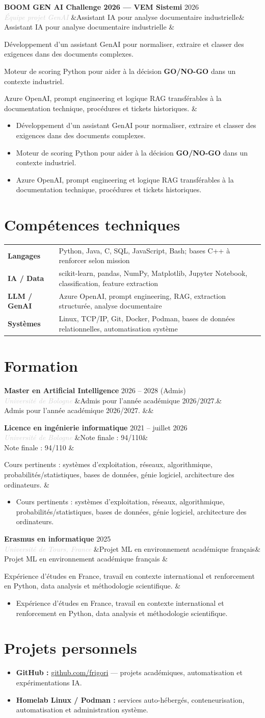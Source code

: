 \documentclass[a4paper,10pt]{article}
\newcommand{\entrylist}[5]{%
  \noindent\textbf{#1} \hfill \textcolor{accent}{#2}\\
  \textit{\textcolor{lightgray}{#3}}%
  \ifx&#4&\else\\[-0.05em]#4\fi
  \vspace{0.15em}
  \ifx&#5&\else\begin{itemize}#5\end{itemize}\fi
  \vspace{0.1em}
}
\newcommand{\skillrow}[2]{\textbf{#1} & #2 \\[0.15em]}
\begin{document}
\entrylist{BOOM GEN AI Challenge 2026 — VEM Sistemi}{2026}{Équipe projet GenAI}{Assistant IA pour analyse documentaire industrielle}{
  \item Développement d'un assistant GenAI pour normaliser, extraire et classer des exigences dans des documents complexes.
  \item Moteur de scoring Python pour aider à la décision \textbf{GO/NO-GO} dans un contexte industriel.
  \item Azure OpenAI, prompt engineering et logique RAG transférables à la documentation technique, procédures et tickets historiques.
}

\section{Compétences techniques}
\begin{tabularx}{\textwidth}{@{}>{\raggedright\arraybackslash}p{3.1cm}X@{}}
\skillrow{Langages}{Python, Java, C, SQL, JavaScript, Bash; bases C++ à renforcer selon mission}
\skillrow{IA / Data}{scikit-learn, pandas, NumPy, Matplotlib, Jupyter Notebook, classification, feature extraction}
\skillrow{LLM / GenAI}{Azure OpenAI, prompt engineering, RAG, extraction structurée, analyse documentaire}
\skillrow{Systèmes}{Linux, TCP/IP, Git, Docker, Podman, bases de données relationnelles, automatisation système}
\end{tabularx}

\section{Formation}
\entrylist{Master en Artificial Intelligence}{2026 -- 2028 (Admis)}{Université de Bologne}{Admis pour l'année académique 2026/2027.}{}

\entrylist{Licence en ingénierie informatique}{2021 -- juillet 2026}{Université de Bologne}{Note finale : 94/110}{
  \item Cours pertinents : systèmes d'exploitation, réseaux, algorithmique, probabilités/statistiques, bases de données, génie logiciel, architecture des ordinateurs.
}

\entrylist{Erasmus en informatique}{2025}{Université de Tours, France}{Projet ML en environnement académique français}{
  \item Expérience d'études en France, travail en contexte international et renforcement en Python, data analysis et méthodologie scientifique.
}

\section{Projets personnels}
\begin{itemize}
  \item \textbf{GitHub :} \href{https://github.com/frigori}{github.com/frigori} — projets académiques, automatisation et expérimentations IA.
  \item \textbf{Homelab Linux / Podman :} services auto-hébergés, conteneurisation, automatisation et administration système.
\end{itemize}
\end{document}
